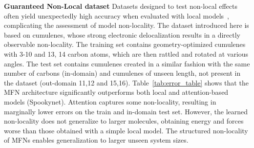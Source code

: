 \documentclass{article} \usepackage{iclr2024_conference,times}
\begin{document}
\textbf{Guaranteed Non-Local dataset}
Datasets designed to test non-local effects often yield unexpectedly high accuracy when evaluated with local models~\citep{kovacsEvaluationMACEForce2023}, complicating the assessment of model non-locality. The dataset introduced here is based on cumulenes, whose strong electronic delocalization results in a directly observable non-locality. The training set contains geometry-optimized cumulenes with 3-10 and 13, 14 carbon atoms, which are then rattled and rotated at various angles. The test set contains cumulenes created in a similar fashion with the same number of carbons (in-domain) and cumulenes of unseen length, not present in the dataset (out-domain 11,12 and 15,16).  Table~\ref{tab:error_table} shows that the MFN architecture significantly outperforms both local and attention-based models (Spookynet). Attention captures some non-locality, resulting in marginally lower errors on the train and in-domain test set. However, the learned non-locality does not generalize to larger molecules, obtaining energy and forces worse than those obtained with a simple local model. The structured non-locality of MFNs enables generalization to larger unseen system sizes.
\begin{table}[htp]
    \centering
    \caption{\textbf{Guaranteed non-local cumulene dataset} containing rattled cumulene chains, with various chain lengths () and hydrogen dihedral angles (). The table compares energy (E) and forces (F) RMSEs between local two-layer MPNNs (MACE), global attention MPNNs (SpookyNet), and equivariant MFNs. Train and in-domain test sets contain cumulenes of lengths 3-10 and 13,14. Two out-domain test sets compare different levels of extrapolation to unseen cumulene lengths, containing cumulenes with 11, 12 and 15, 16 carbon atoms, respectively. Bold is best and underline second best.}
    \vspace{-14pt}
    \label{tab:error_table}
\end{table}
\end{document}
